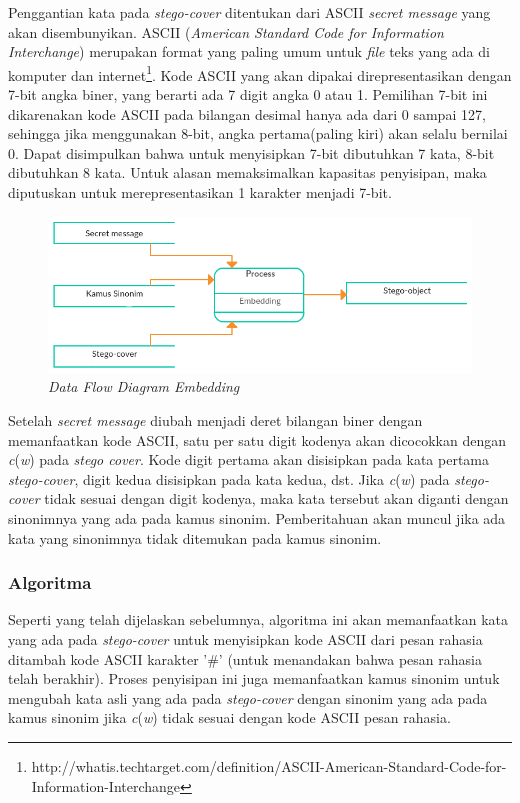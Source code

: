 Penggantian kata pada \textit{stego-cover} ditentukan dari ASCII \textit{secret message} yang akan disembunyikan. ASCII (\textit{American Standard Code for Information Interchange}) merupakan format yang paling umum untuk \textit{file} teks yang ada di komputer dan internet\footnote{http://whatis.techtarget.com/definition/ASCII-American-Standard-Code-for-Information-Interchange}. Kode ASCII yang akan dipakai direpresentasikan dengan 7-bit angka biner, yang berarti ada 7 digit angka 0 atau 1. Pemilihan 7-bit ini dikarenakan kode ASCII pada bilangan desimal hanya ada dari 0 sampai 127, sehingga jika menggunakan 8-bit, angka pertama(paling kiri) akan selalu bernilai 0. Dapat disimpulkan bahwa untuk menyisipkan 7-bit dibutuhkan 7 kata, 8-bit dibutuhkan 8 kata.  Untuk alasan memaksimalkan kapasitas penyisipan, maka diputuskan untuk merepresentasikan 1 karakter menjadi 7-bit.

\begin{figure}[H]
	\centering
	\includegraphics[scale=0.8]{Gambar/dfd-embed}
	\caption{\textit{Data Flow Diagram Embedding}} 
	\label{fig:4-dfd-embed}
\end{figure}

Setelah \textit{secret message} diubah menjadi deret bilangan biner dengan memanfaatkan kode ASCII, satu per satu digit kodenya akan dicocokkan dengan \textit{c}(\textit{w}) pada \textit{stego cover}. Kode digit pertama akan disisipkan pada kata pertama \textit{stego-cover}, digit kedua disisipkan pada kata kedua, dst. Jika \textit{c}(\textit{w}) pada \textit{stego-cover} tidak sesuai dengan digit kodenya, maka kata tersebut akan diganti dengan sinonimnya yang ada pada kamus sinonim. Pemberitahuan akan muncul jika ada kata yang sinonimnya tidak ditemukan pada kamus sinonim.

\subsubsection{Algoritma}
\label{algoritma}
Seperti yang telah dijelaskan sebelumnya, algoritma ini akan memanfaatkan kata yang ada pada \textit{stego-cover} untuk menyisipkan kode ASCII dari pesan rahasia ditambah kode ASCII karakter '\#' (untuk menandakan bahwa pesan rahasia telah berakhir). Proses penyisipan ini juga memanfaatkan kamus sinonim untuk mengubah kata asli yang ada pada \textit{stego-cover} dengan sinonim yang ada pada kamus sinonim jika \textit{c}(\textit{w}) tidak sesuai dengan kode ASCII pesan rahasia.

